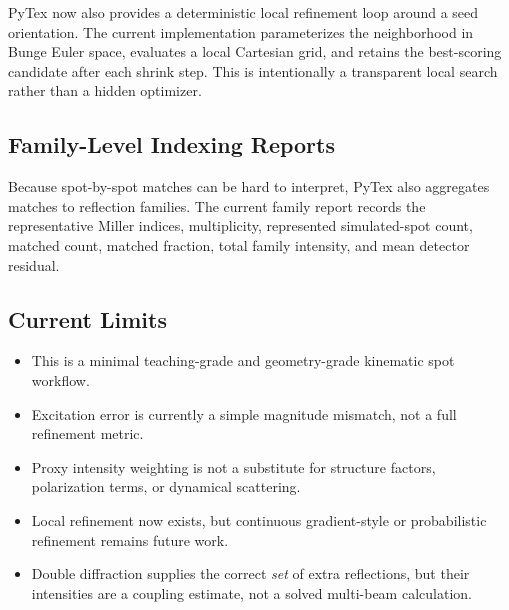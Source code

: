 PyTex now also provides a deterministic local refinement loop around a seed orientation. The current implementation parameterizes the neighborhood in Bunge Euler space, evaluates a local Cartesian grid, and retains the best-scoring candidate after each shrink step. This is intentionally a transparent local search rather than a hidden optimizer.

\subsection{Family-Level Indexing Reports}

Because spot-by-spot matches can be hard to interpret, PyTex also aggregates matches to reflection families. The current family report records the representative Miller indices, multiplicity, represented simulated-spot count, matched count, matched fraction, total family intensity, and mean detector residual.

\subsection{Current Limits}

\begin{itemize}
  \item This is a minimal teaching-grade and geometry-grade kinematic spot workflow.
  \item Excitation error is currently a simple magnitude mismatch, not a full refinement metric.
  \item Proxy intensity weighting is not a substitute for structure factors, polarization terms, or dynamical scattering.
  \item Local refinement now exists, but continuous gradient-style or probabilistic refinement remains future work.
  \item Double diffraction supplies the correct \emph{set} of extra reflections, but their intensities are a coupling estimate, not a solved multi-beam calculation.
\end{itemize}
